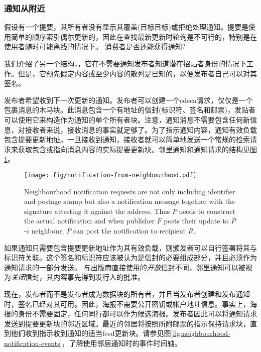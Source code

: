 \subsubsection{通知从附近}

假设有一个提要，其所有者没有显示其覆盖(目标目标)或拒绝处理通知。提要是使用简单的顺序索引偶尔更新的，因此在查找最新更新时轮询是不可行的，特别是在使用者随时可能离线的情况下。
消费者是否还能获得通知? 

我们介绍了另一个结构，，它在不需要通知发布者知道潜在招贴者身份的情况下工作。但是，它预先假定内容或至少内容的散列是已知的，以便发布者自己可以对其签名。


发布者希望收到下一次更新的通知。发布者可以创建一个cdeca请求，仅仅是一个包裹消息的木马块。此消息包含一个有地址的信封(标识符、签名和邮票)，发贴者可以使用它来构造作为通知的单个所有者块。注意，通知消息不需要包含任何新信息，对接收者来说，接收消息的事实就足够了。为了指示通知内容，通知有效负载包含提要更新地址。一旦接收到通知，接收者就可以简单地发送一个常规的检索请求来获取包含或指向消息内容的实际提要更新块。邻里通知和通知请求的结构见图\ref{fig:notification-from-neighbourhood}。
                                

\begin{figure}[htbp]
\centering
\texttt{[image: fig/notification-from-neighbourhood.pdf]}
\caption[Neighbourhood notifications \statusgreen]{Neighbourhood notification requests are not only including identifier and postage stamp but also a notification message together with the signature attesting it against the address. Thus $P$ needs to construct the actual notification and when publisher $F$ posts their update to $P$-s neighbour, $P$ can post the notification to recipient $R$.}
\label{fig:notification-from-neighbourhood}
\end{figure}

如果通知只需要包含提要更新地址作为其有效负载，则颁发者可以自行签署将其与标识符关联。这个签名和标识符应该被认为是信封的必要组成部分，并且必须作为通知请求的一部分发送。
与出版商直接使用的\emph{开放}信封不同，邻里通知可以被视为\emph{关闭}信封，其内容事先得到发行人的批准。 

现在，发布者而不是发布者成为数据块的所有者，并且当发布者创建和发布通知时，签名已经对其可用。因此，海报不需要公开密钥或帐户地址信息。事实上，海报的身份不需要固定，任何同行都可以作为候选海报。发布者因此可以将通知请求发送到提要更新块的邻近区域。最近的邻居将按照所附邮票的指示保持请求块，直到他们收到指示收到通知的适当feed更新块。请参见图\ref{fig:neighbourhood-notification-events}，了解使用邻居通知时的事件时间轴。

